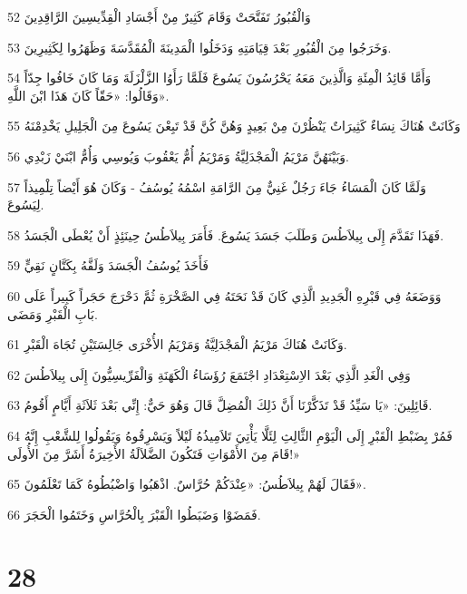 \par 52 وَالْقُبُورُ تَفَتَّحَتْ وَقَامَ كَثِيرٌ مِنْ أَجْسَادِ الْقِدِّيسِينَ الرَّاقِدِينَ
\par 53 وَخَرَجُوا مِنَ الْقُبُورِ بَعْدَ قِيَامَتِهِ وَدَخَلُوا الْمَدِينَةَ الْمُقَدَّسَةَ وَظَهَرُوا لِكَثِيرِينَ.
\par 54 وَأَمَّا قَائِدُ الْمِئَةِ وَالَّذِينَ مَعَهُ يَحْرُسُونَ يَسُوعَ فَلَمَّا رَأَوُا الزَّلْزَلَةَ وَمَا كَانَ خَافُوا جِدّاً وَقَالُوا: «حَقّاً كَانَ هَذَا ابْنَ اللَّهِ».
\par 55 وَكَانَتْ هُنَاكَ نِسَاءٌ كَثِيرَاتٌ يَنْظُرْنَ مِنْ بَعِيدٍ وَهُنَّ كُنَّ قَدْ تَبِعْنَ يَسُوعَ مِنَ الْجَلِيلِ يَخْدِمْنَهُ
\par 56 وَبَيْنَهُنَّ مَرْيَمُ الْمَجْدَلِيَّةُ وَمَرْيَمُ أُمُّ يَعْقُوبَ وَيُوسِي وَأُمُّ ابْنَيْ زَبْدِي.
\par 57 وَلَمَّا كَانَ الْمَسَاءُ جَاءَ رَجُلٌ غَنِيٌّ مِنَ الرَّامَةِ اسْمُهُ يُوسُفُ - وَكَانَ هُوَ أَيْضاً تِلْمِيذاً لِيَسُوعَ.
\par 58 فَهَذَا تَقَدَّمَ إِلَى بِيلاَطُسَ وَطَلَبَ جَسَدَ يَسُوعَ. فَأَمَرَ بِيلاَطُسُ حِينَئِذٍ أَنْ يُعْطَى الْجَسَدُ.
\par 59 فَأَخَذَ يُوسُفُ الْجَسَدَ وَلَفَّهُ بِكَتَّانٍ نَقِيٍّ
\par 60 وَوَضَعَهُ فِي قَبْرِهِ الْجَدِيدِ الَّذِي كَانَ قَدْ نَحَتَهُ فِي الصَّخْرَةِ ثُمَّ دَحْرَجَ حَجَراً كَبِيراً عَلَى بَابِ الْقَبْرِ وَمَضَى.
\par 61 وَكَانَتْ هُنَاكَ مَرْيَمُ الْمَجْدَلِيَّةُ وَمَرْيَمُ الأُخْرَى جَالِسَتَيْنِ تُجَاهَ الْقَبْرِ.
\par 62 وَفِي الْغَدِ الَّذِي بَعْدَ الاِسْتِعْدَادِ اجْتَمَعَ رُؤَسَاءُ الْكَهَنَةِ وَالْفَرِّيسِيُّونَ إِلَى بِيلاَطُسَ
\par 63 قَائِلِينَ: «يَا سَيِّدُ قَدْ تَذَكَّرْنَا أَنَّ ذَلِكَ الْمُضِلَّ قَالَ وَهُوَ حَيٌّ: إِنِّي بَعْدَ ثَلاَثَةِ أَيَّامٍ أَقُومُ.
\par 64 فَمُرْ بِضَبْطِ الْقَبْرِ إِلَى الْيَوْمِ الثَّالِثِ لِئَلَّا يَأْتِيَ تَلاَمِيذُهُ لَيْلاً وَيَسْرِقُوهُ وَيَقُولُوا لِلشَّعْبِ إِنَّهُ قَامَ مِنَ الأَمْوَاتِ فَتَكُونَ الضَّلاَلَةُ الأَخِيرَةُ أَشَرَّ مِنَ الأُولَى!»
\par 65 فَقَالَ لَهُمْ بِيلاَطُسُ: «عِنْدَكُمْ حُرَّاسٌ. اذْهَبُوا وَاضْبُطُوهُ كَمَا تَعْلَمُونَ».
\par 66 فَمَضَوْا وَضَبَطُوا الْقَبْرَ بِالْحُرَّاسِ وَخَتَمُوا الْحَجَرَ.

\chapter{28}

